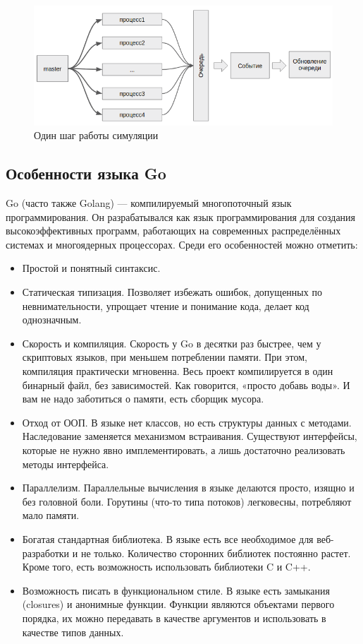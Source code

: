 \begin{figure}[!ht]
\centering
\includegraphics[width=\textwidth]{Kenenbek/images/libstep.png}
\caption{Один шаг работы симуляции}
\label{fig:libstep}
\end{figure}

\subsection{Особенности языка Go}
\par
Go (часто также Golang) — компилируемый многопоточный язык программирования. Он разрабатывался как язык программирования для создания высокоэффективных программ, работающих на современных распределённых системах и многоядерных процессорах. Среди его особенностей можно отметить:

\begin{itemize}
\item Простой и понятный синтаксис.
\item Статическая типизация. Позволяет избежать ошибок, допущенных по невнимательности, упрощает чтение и понимание кода, делает код однозначным.
\item Скорость и компиляция. Скорость у Go в десятки раз быстрее, чем у скриптовых языков, при меньшем потреблении памяти. При этом, компиляция практически мгновенна. Весь проект компилируется в один бинарный файл, без зависимостей. Как говорится, «просто добавь воды». И вам не надо заботиться о памяти, есть сборщик мусора.
\item Отход от ООП. В языке нет классов, но есть структуры данных с методами. Наследование заменяется механизмом встраивания. Существуют интерфейсы, которые не нужно явно имплементировать, а лишь достаточно реализовать методы интерфейса.
\item Параллелизм. Параллельные вычисления в языке делаются просто, изящно и без головной боли. Горутины (что-то типа потоков) легковесны, потребляют мало памяти.
\item Богатая стандартная библиотека. В языке есть все необходимое для веб-разработки и не только. Количество сторонних библиотек постоянно растет. Кроме того, есть возможность использовать библиотеки C и C++.
\item Возможность писать в функциональном стиле. В языке есть замыкания (closures) и анонимные функции. Функции являются объектами первого порядка, их можно передавать в качестве аргументов и использовать в качестве типов данных.
\end{itemize}

